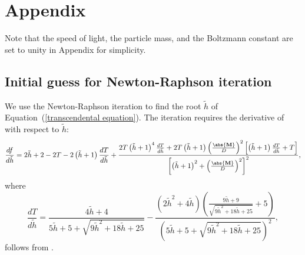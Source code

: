 \chapter{Appendix}
\label{c:appendix}
Note that the speed of light, the particle mass, and the Boltzmann constant are set to unity in Appendix for simplicity.

\section{Initial guess for Newton-Raphson iteration}
\label{The choice of initial guesses}
We use the Newton-Raphson iteration to find the root $\tilde{h}$ of Equation~(\ref{transcendental equation}). The iteration requires the derivative of  with respect to $\tilde{h}$:
\begin{equation}
\frac{df}{d\tilde{h}}=2\tilde{h}+2-2T-2\left(\tilde{h}+1\right)\frac{dT}{d\tilde{h}}+\frac{2T\left(\tilde{h}+1\right)^4\frac{dT}{d\tilde{h}}+2T\left(\tilde{h}+1\right)\left(\frac{\abs{\mathbf{M}}}{D}\right)^2\left[\left(\tilde{h}+1\right)\frac{dT}{d\tilde{h}}+T\right]}{\left[\left(\tilde{h}+1\right)^2+\left(\frac{\abs{\mathbf{M}}}{D}\right)^2\right]^2},
\end{equation}
where
\begin{equation}
\frac{dT}{d\tilde{h}}=\frac{4\tilde{h}+4}{5\tilde{h}+5+\sqrt{9\tilde{h}^2+18\tilde{h}+25}}
-\frac{\left(2\tilde{h}^2+4\tilde{h}\right)\left(\frac{9\tilde{h}+9}{\sqrt{9\tilde{h}^2+18\tilde{h}+25}}+5\right)}{\left(5\tilde{h}+5+\sqrt{9\tilde{h}^2+18\tilde{h}+25}\right)^2},
\label{dT_dh}
\end{equation}
follows from .

